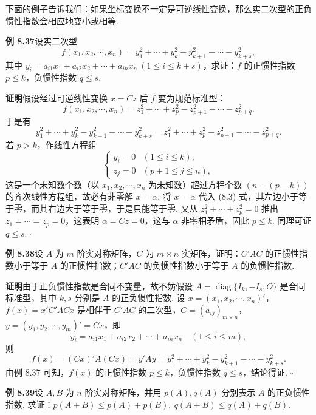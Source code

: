\documentclass[UTF8,12pt,a4paper,fontset=fandol]{ctexart}
\begin{document}
下面的例子告诉我们：如果坐标变换不一定是可逆线性变换，那么实二次型的正负惯性指数会相应地变小或相等.

\noindent\textbf{例 8.37}\quad 设实二次型
\[
f(x_1,x_2,\cdots,x_n)=y_1^2+\cdots+y_k^2-y_{k+1}^2-\cdots-y_{k+s}^2,
\]
其中 $y_i=a_{i1}x_1+a_{i2}x_2+\cdots+a_{in}x_n\ (1\le i\le k+s)$，求证：$f$ 的正惯性指数 $p\le k$，负惯性指数 $q\le s$.

\noindent\textbf{证明}\quad 假设经过可逆线性变换 $x=Cz$ 后 $f$ 变为规范标准型：
\[
f(x_1,x_2,\cdots,x_n)=z_1^2+\cdots+z_p^2-z_{p+1}^2-\cdots-z_{p+q}^2.
\]
于是有
\begin{equation}
y_1^2+\cdots+y_k^2-y_{k+1}^2-\cdots-y_{k+s}^2
=z_1^2+\cdots+z_p^2-z_{p+1}^2-\cdots-z_{p+q}^2.
\tag{8.3}
\end{equation}
若 $p>k$，作线性方程组
\[
\left\{\begin{array}{ll}
y_i=0 &(1\le i\le k),\\
z_j=0 &(p+1\le j\le n),
\end{array}\right.
\]
这是一个未知数个数（以 $x_1,x_2,\cdots,x_n$ 为未知数）超过方程个数 $(n-(p-k))$ 的齐次线性方程组，故必有非零解 $x=\alpha$. 将 $x=\alpha$ 代入 (8.3) 式，其左边小于等于零，而其右边大于等于零，于是只能等于零. 又从 $z_1^2+\cdots+z_p^2=0$ 推出 $z_1=\cdots=z_p=0$，这表明 $\alpha=Cz=0$，这与 $\alpha$ 非零相矛盾，因此 $p\le k$. 同理可证 $q\le s$. $\ensuremath{\square}$

\noindent\textbf{例 8.38}\quad 设 $A$ 为 $m$ 阶实对称矩阵，$C$ 为 $m\times n$ 实矩阵，证明：$C'AC$ 的正惯性指数小于等于 $A$ 的正惯性指数；$C'AC$ 的负惯性指数小于等于 $A$ 的负惯性指数.

\noindent\textbf{证明}\quad 由于正负惯性指数是合同不变量，故不妨假设 $A=\operatorname{diag}\{I_k,-I_s,O\}$ 是合同标准型，其中 $k,s$ 分别是 $A$ 的正负惯性指数. 设 $x=(x_1,x_2,\cdots,x_n)'$，$f(x)=x'C'ACx$ 是相伴于 $C'AC$ 的二次型，$C=(a_{ij})_{m\times n}$，$y=(y_1,y_2,\cdots,y_m)'=Cx$，即
\[
y_i=a_{i1}x_1+a_{i2}x_2+\cdots+a_{in}x_n\quad (1\le i\le m),
\]
则
\[
f(x)=(Cx)'A(Cx)=y'Ay=y_1^2+\cdots+y_k^2-y_{k+1}^2-\cdots-y_{k+s}^2.
\]
由例 8.37 可知，$f(x)$ 的正惯性指数 $p\le k$，负惯性指数 $q\le s$，结论得证. $\ensuremath{\square}$

\noindent\textbf{例 8.39}\quad 设 $A,B$ 为 $n$ 阶实对称矩阵，并用 $p(A),q(A)$ 分别表示 $A$ 的正负惯性指数. 求证：$p(A+B)\le p(A)+p(B),\ q(A+B)\le q(A)+q(B)$.
\end{document}
